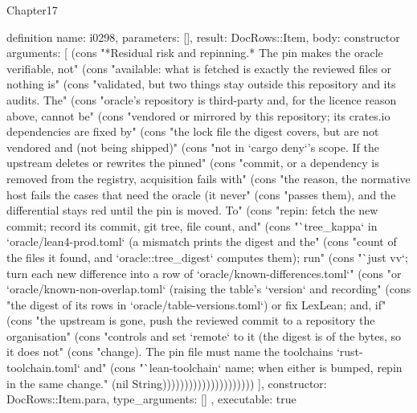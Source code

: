 \begin{lexlean}{Chapter17}
\begin{semanticmodule}
definition{
  name: i0298,
  parameters: [],
  result: DocRows::Item,
  body: constructor{
    arguments: [
      (cons "*Residual risk and repinning.* The pin makes the oracle verifiable, not" (cons "available: what is fetched is exactly the reviewed files or nothing is" (cons "validated, but two things stay outside this repository and its audits. The" (cons "oracle's repository is third-party and, for the licence reason above, cannot be" (cons "vendored or mirrored by this repository; its crates.io dependencies are fixed by" (cons "the lock file the digest covers, but are not vendored and (not being shipped)" (cons "not in `cargo deny`'s scope. If the upstream deletes or rewrites the pinned" (cons "commit, or a dependency is removed from the registry, acquisition fails with" (cons "the reason, the normative host fails the cases that need the oracle (it never" (cons "passes them), and the differential stays red until the pin is moved. To" (cons "repin: fetch the new commit; record its commit, git tree, file count, and" (cons "`tree_kappa` in `oracle/lean4-prod.toml` (a mismatch prints the digest and the" (cons "count of the files it found, and `oracle::tree_digest` computes them); run" (cons "`just vv`; turn each new difference into a row of `oracle/known-differences.toml`" (cons "or `oracle/known-non-overlap.toml` (raising the table's `version` and recording" (cons "the digest of its rows in `oracle/table-versions.toml`) or fix LexLean; and, if" (cons "the upstream is gone, push the reviewed commit to a repository the organisation" (cons "controls and set `remote` to it (the digest is of the bytes, so it does not" (cons "change). The pin file must name the toolchains `rust-toolchain.toml` and" (cons "`lean-toolchain` name; when either is bumped, repin in the same change." (nil String)))))))))))))))))))))
    ],
    constructor: DocRows::Item.para,
    type_arguments: []
  },
  executable: true
}


\end{semanticmodule}
\end{lexlean}

